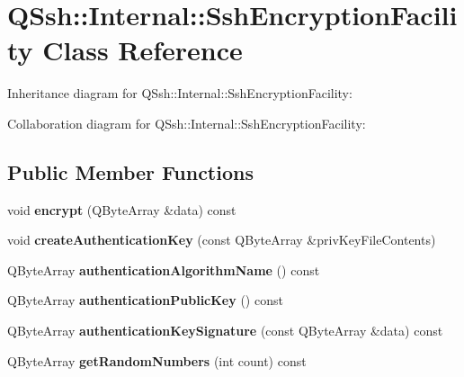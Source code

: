 \hypertarget{class_q_ssh_1_1_internal_1_1_ssh_encryption_facility}{}\section{Q\+Ssh\+:\+:Internal\+:\+:Ssh\+Encryption\+Facility Class Reference}
\label{class_q_ssh_1_1_internal_1_1_ssh_encryption_facility}


Inheritance diagram for Q\+Ssh\+:\+:Internal\+:\+:Ssh\+Encryption\+Facility\+:


Collaboration diagram for Q\+Ssh\+:\+:Internal\+:\+:Ssh\+Encryption\+Facility\+:
\subsection*{Public Member Functions}
\begin{DoxyCompactItemize}
\item 
\mbox{\label{class_q_ssh_1_1_internal_1_1_ssh_encryption_facility_a9c2878a660ce3963c3366e7430395188}} 
void {\bfseries encrypt} (Q\+Byte\+Array \&data) const
\item 
\mbox{\label{class_q_ssh_1_1_internal_1_1_ssh_encryption_facility_a1b8c328aa750e03dde943ccfed7ab93f}} 
void {\bfseries create\+Authentication\+Key} (const Q\+Byte\+Array \&priv\+Key\+File\+Contents)
\item 
\mbox{\label{class_q_ssh_1_1_internal_1_1_ssh_encryption_facility_a99f8d508143a96c92c22000173a7a4e3}} 
Q\+Byte\+Array {\bfseries authentication\+Algorithm\+Name} () const
\item 
\mbox{\label{class_q_ssh_1_1_internal_1_1_ssh_encryption_facility_a7402d077c10f61f8e4c29fad54942602}} 
Q\+Byte\+Array {\bfseries authentication\+Public\+Key} () const
\item 
\mbox{\label{class_q_ssh_1_1_internal_1_1_ssh_encryption_facility_a126035fe2d14a757a5812945b975fa2c}} 
Q\+Byte\+Array {\bfseries authentication\+Key\+Signature} (const Q\+Byte\+Array \&data) const
\item 
\mbox{\label{class_q_ssh_1_1_internal_1_1_ssh_encryption_facility_abd67ad5720d002c576cd857c424d9026}} 
Q\+Byte\+Array {\bfseries get\+Random\+Numbers} (int count) const
\end{DoxyCompactItemize}
